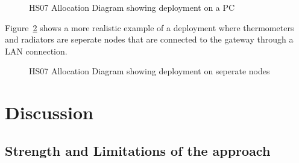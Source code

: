 \documentclass[a4paper,10pt]{article}
\begin{document}
\begin{figure}[!htb]
\caption{HS07 Allocation Diagram showing deployment on a PC}
\label{fig:allocation_pc}
\end{figure}

Figure~\ref{fig:allocation_actual} shows a more realistic example of a deployment
where thermometers and radiators are seperate nodes that are connected to
the gateway through a LAN connection.

\begin{figure}[!htb]
\caption{HS07 Allocation Diagram showing deployment on seperate nodes}
\label{fig:allocation_actual}
\end{figure}


\section{Discussion}
\subsection{Strength and Limitations of the approach}
\end{document}
